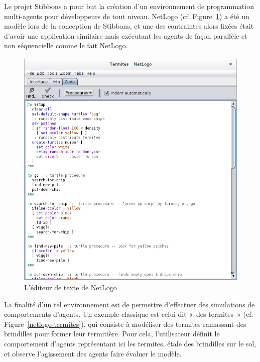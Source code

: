 
Le projet Stibbons a pour but la création d'un environnement de programmation multi-agents pour développeurs de tout niveau. NetLogo (cf. Figure~\ref{netlogo-code}) a été un modèle lors de la conception de Stibbons, et une des contraintes alors fixées était d'avoir une application similaire mais exécutant les agents de façon parallèle et non séquencielle comme le fait NetLogo.

\begin{figure}[h]
\centering
\includegraphics[scale=0.3]{doc/gestionProjet/netlogo-code.png}
\caption{\label{netlogo-code} L'éditeur de texte de NetLogo}
\end{figure}

La finalité d'un tel environnement est de permettre d'effectuer des simulations de comportements d'agents. Un exemple classique est celui dit «~des termites~» (cf. Figure~\ref{netlogo-termites}), qui consiste à modéliser des termites ramassant des brindilles pour former leur termitière.
Pour cela, l'utilisateur définit le comportement d'agents représentant ici les termites, étale des brindilles sur le sol, et observe l'agissement des agents faire évoluer le modèle.

